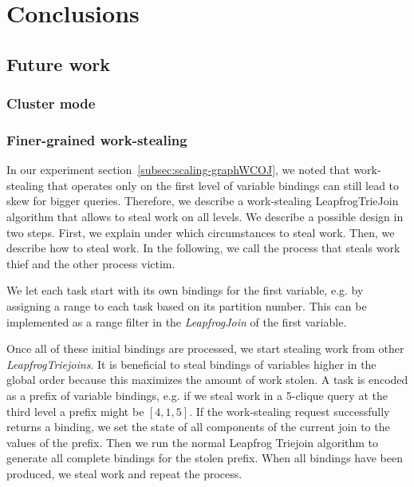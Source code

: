 \section{Conclusions} \label{sec:conclusions}



\subsection{Future work} \label{subsec:future-work}

\subsubsection{Cluster mode} \label{subsubsec:cluster-mode}

\subsubsection{Finer-grained work-stealing} \label{subsubsec:finer-grained-work-stealing}
In our experiment section~\ref{subsec:scaling-graphWCOJ}, we noted that work-stealing that
operates only on the first level of variable bindings can still lead to skew for bigger queries.
Therefore, we describe a work-stealing LeapfrogTrieJoin algorithm that allows to steal work
on all levels.
We describe a possible design in two steps.
First, we explain under which circumstances to steal work.
Then, we describe how to steal work.
In the following, we call the process that steals work thief and the other process
victim.

We let each task start with its own bindings for the first variable, e.g. by assigning
a range to each task based on its partition number.
This can be implemented as a range filter in the \textit{LeapfrogJoin} of the first variable.

Once all of these initial bindings are processed, we start stealing work from other
\textit{LeapfrogTriejoins}.
It is beneficial to steal bindings of variables higher in the global order because this
maximizes the amount of work stolen.
A task is encoded as a prefix of variable bindings, e.g. if we steal work in a 5-clique query at
the third level a prefix might be $[4, 1 , 5]$.
If the work-stealing request successfully returns a binding, we set the state of all components
of the current join to the values of the prefix.
Then we run the normal Leapfrog Triejoin algorithm to generate all complete bindings for the stolen
prefix.
When all bindings have been produced, we steal work and repeat the process.

